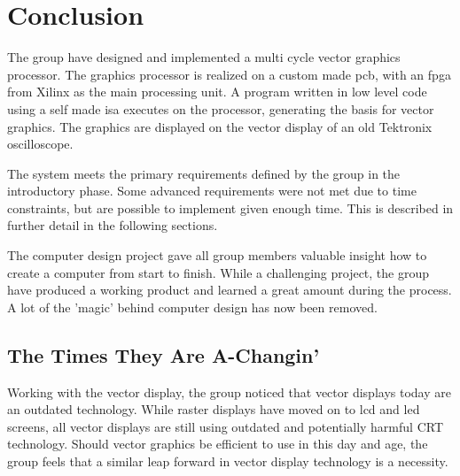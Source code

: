 \chapter{Conclusion}
The group have designed and implemented a multi cycle vector graphics processor.
The graphics processor is realized on a custom made \gls{pcb}, with an \gls{fpga} from Xilinx as the main processing unit.
A program written in low level code using a self made \gls{isa} executes on the processor, generating the basis for vector graphics.
The graphics are displayed on the vector display of an old Tektronix oscilloscope.

The system meets the primary requirements defined by the group in the introductory phase. 
Some advanced requirements were not met due to time constraints, but are possible to implement given enough time. 
This is described in further detail in the following sections.

The computer design project gave all group members valuable insight how to create a computer from start to finish.
While a challenging project, the group have produced a working product and learned a great amount during the process.
A lot of the 'magic' behind computer design has now been removed.

\section{The Times They Are A-Changin'}
Working with the vector display, the group noticed that vector displays today are an outdated technology. 
While raster displays have moved on to \gls{lcd} and \gls{led} screens, all vector displays are still using outdated and potentially harmful CRT technology.
Should vector graphics be efficient to use in this day and age, the group feels that a similar leap forward in vector display technology is a necessity.